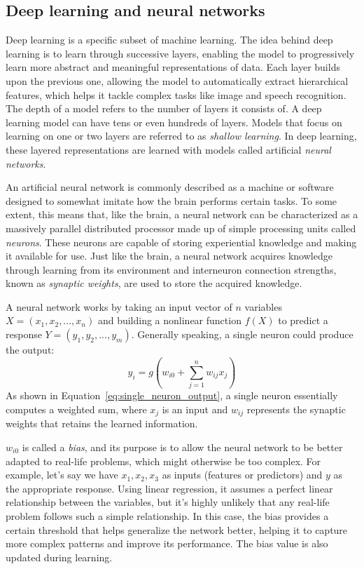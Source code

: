 \documentclass[a4paper,oneside,onecolumn,12pt]{book}
\begin{document}
	\subsection{Deep learning and neural networks}
	Deep learning is a specific subset of machine learning. The idea behind deep learning is to learn through successive layers, enabling the model to progressively learn more abstract and meaningful representations of data. Each layer builds upon the previous one, allowing the model to automatically extract hierarchical features, which helps it tackle complex tasks like image and speech recognition. The depth of a model refers to the number of layers it consists of. A deep learning model can have tens or even hundreds of layers. Models that focus on learning on one or two layers are referred to as \textit{shallow learning}. In deep learning, these layered representations are learned with models called artificial \textit{neural networks}. \cite{DLP}

	An artificial neural network is commonly described as a machine or software designed to somewhat imitate how the brain performs certain tasks. To some extent, this means that, like the brain, a neural network can be characterized as a massively parallel distributed processor made up of simple processing units called \textit{neurons}. These neurons are capable of storing experiential knowledge and making it available for use. Just like the brain, a neural network acquires knowledge through learning from its environment and interneuron connection strengths, known as \textit{synaptic weights}, are used to store the acquired knowledge. \cite{NNACF}

	A neural network works by taking an input vector of $n$ variables $X = (x_1, x_2, ..., x_n)$ and building a nonlinear function $f(X)$ to predict a response $Y = (y_1, y_2, ..., y_m)$. Generally speaking, a single neuron could produce the output:
	\begin{equation}
		y_i = g\left( w_{i0} + \sum_{j=1}^{n} w_{ij} x_j \right)
		\label{eq:single_neuron_output}
	\end{equation}
	As shown in Equation~\ref{eq:single_neuron_output}, a single neuron essentially computes a weighted sum, where $x_j$ is an input and $w_{ij}$ represents the synaptic weights that retains the learned information. \cite{AISL}

	$w_{i0}$ is called a \textit{bias}, and its purpose is to allow the neural network to be better adapted to real-life problems, which might otherwise be too complex. For example, let's say we have $x_1, x_2, x_3$ as inputs (features or predictors) and $y$ as the appropriate response. Using linear regression, it assumes a perfect linear relationship between the variables, but it's highly unlikely that any real-life problem follows such a simple relationship. In this case, the bias provides a certain threshold that helps generalize the network better, helping it to capture more complex patterns and improve its performance. The bias value is also updated during learning. \cite{AISL}
\end{document}
